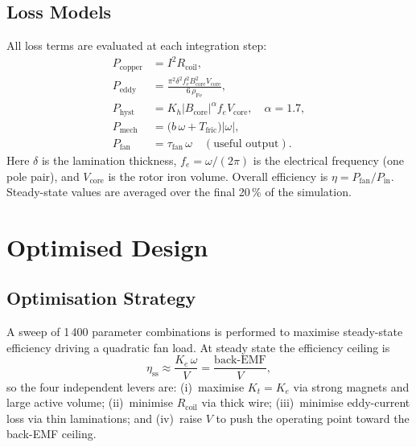 \documentclass[10pt, twocolumn, a4paper]{article}
\begin{document}
\subsection{Loss Models}

All loss terms are evaluated at each integration step:
\begin{align}
  P_\text{copper} &= I^2 R_\text{coil},
  \label{eq:Pcu}\\
  P_\text{eddy}   &=
    \frac{\pi^2 \delta^2 f_e^2 B_\text{core}^2 V_\text{core}}
         {6\,\rho_\text{Fe}},
  \label{eq:Peddy}\\
  P_\text{hyst}   &= K_h |B_\text{core}|^\alpha f_e V_\text{core},\quad \alpha=1.7,
  \label{eq:Physt}\\
  P_\text{mech}   &= \bigl(b\,\omega + T_\text{fric}\bigr)|\omega|,
  \label{eq:Pmech}\\
  P_\text{fan}    &= \tau_\text{fan}\,\omega \quad (\text{useful output}).
  \label{eq:Pfan}
\end{align}
Here $\delta$ is the lamination thickness, $f_e = \omega/(2\pi)$ is the
electrical frequency (one pole pair), and $V_\text{core}$ is the rotor
iron volume. Overall efficiency is $\eta = P_\text{fan}/P_\text{in}$.
Steady-state values are averaged over the final 20\,\% of the simulation.

\section{Optimised Design}
\label{sec:optim}

\subsection{Optimisation Strategy}

A sweep of 1\,400 parameter combinations is performed to maximise
steady-state efficiency driving a quadratic fan load.  At steady state
the efficiency ceiling is
\begin{equation}
  \eta_\text{ss} \approx \frac{K_e\,\omega}{V}
                        = \frac{\text{back-EMF}}{V},
  \label{eq:etass}
\end{equation}
so the four independent levers are: (i)~maximise $K_t = K_e$ via strong
magnets and large active volume; (ii)~minimise $R_\text{coil}$ via thick
wire; (iii)~minimise eddy-current loss via thin laminations; and
(iv)~raise $V$ to push the operating point toward the back-EMF ceiling.
\end{document}
